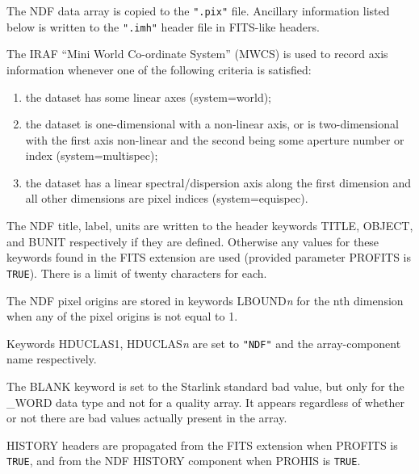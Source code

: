 \documentclass[twoside,11pt]{article}
\newcommand{\xref}[3]{#1}
\newcommand{\sstitem}{\item}
\newcommand{\sstitem}{\item}
\begin{document}
{{{         \sstitem
         The NDF data array is copied to the \texttt{".pix"} file.  Ancillary
         information listed below is written to the \texttt{".imh"} header
         file in FITS-like headers.

         \sstitem
         The IRAF ``Mini World Co-ordinate System'' (MWCS) is used to
         record axis information whenever one of the following criteria is
         satisfied:

         \begin{enumerate}
            \item the dataset has some linear axes (system=world);

            \item the dataset is one-dimensional with a non-linear axis, or is
            two-dimensional with the first axis non-linear and the
            second being some aperture number or index
            (system=multispec);

            \item the dataset has a linear spectral/dispersion axis along the
            first dimension and all other dimensions are pixel indices
            (system=equispec).
         \end{enumerate}

         \sstitem
         The NDF title, label, units are written to the header keywords
         TITLE, OBJECT, and BUNIT respectively if they are defined.
         Otherwise any values for these keywords found in the FITS
         extension are used (provided parameter PROFITS is \texttt{TRUE}).
         There is a limit of twenty characters for each.

         \sstitem
         The NDF pixel origins are stored in keywords LBOUND\textit{n} for the
         nth dimension when any of the pixel origins is not equal to 1.

         \sstitem
         Keywords HDUCLAS1, HDUCLAS\textit{n} are set to \texttt{"NDF"} and the
         array-component name respectively.

         \sstitem
         The BLANK keyword is set to the Starlink standard
         \xref{bad value}{sun95}{se_badmasking},
         but only for the \_WORD data type and not for a quality array.  It
         appears regardless of whether or not there are bad values
         actually present in the array.

         \sstitem
         HISTORY headers are propagated from the FITS extension when
         PROFITS is \texttt{TRUE}, and from the NDF HISTORY component when
         PROHIS is \texttt{TRUE}.

}}}
\end{document}
